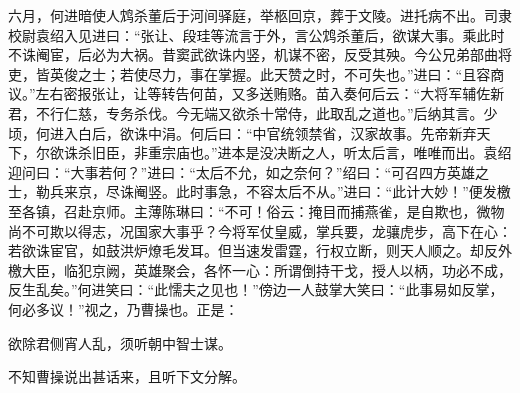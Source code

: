 \documentclass[a4paper]{article}
\begin{document}
六月，何进暗使人鸩杀董后于河间驿庭，举柩回京，葬于文陵。进托病不出。司隶校尉袁绍入见进曰：“张让、段珪等流言于外，言公鸩杀董后，欲谋大事。乘此时不诛阉宦，后必为大祸。昔窦武欲诛内竖，机谋不密，反受其殃。今公兄弟部曲将吏，皆英俊之士；若使尽力，事在掌握。此天赞之时，不可失也。”进曰：“且容商议。”左右密报张让，让等转告何苗，又多送贿赂。苗入奏何后云：“大将军辅佐新君，不行仁慈，专务杀伐。今无端又欲杀十常侍，此取乱之道也。”后纳其言。少顷，何进入白后，欲诛中涓。何后曰：“中官统领禁省，汉家故事。先帝新弃天下，尔欲诛杀旧臣，非重宗庙也。”进本是没决断之人，听太后言，唯唯而出。袁绍迎问曰：“大事若何？”进曰：“太后不允，如之奈何？”绍曰：“可召四方英雄之士，勒兵来京，尽诛阉竖。此时事急，不容太后不从。”进曰：“此计大妙！”便发檄至各镇，召赴京师。主薄陈琳曰：“不可！俗云：掩目而捕燕雀，是自欺也，微物尚不可欺以得志，况国家大事乎？今将军仗皇威，掌兵要，龙骧虎步，高下在心：若欲诛宦官，如鼓洪炉燎毛发耳。但当速发雷霆，行权立断，则天人顺之。却反外檄大臣，临犯京阙，英雄聚会，各怀一心：所谓倒持干戈，授人以柄，功必不成，反生乱矣。”何进笑曰：“此懦夫之见也！”傍边一人鼓掌大笑曰：“此事易如反掌，何必多议！”视之，乃曹操也。正是：
\begin{center}
    \kaishu
    欲除君侧宵人乱，须听朝中智士谋。
\end{center}
不知曹操说出甚话来，且听下文分解。
\end{document}

